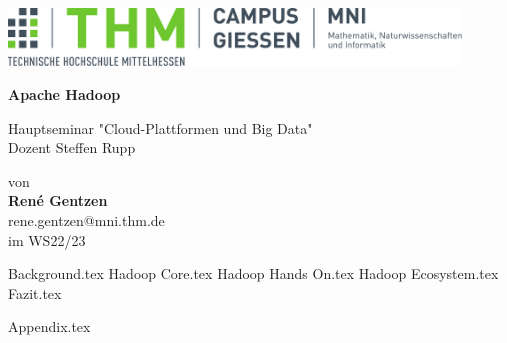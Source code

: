 \documentclass[%
	BCOR=8.25mm,         %
	DIV=12,              %
	parskip=half,		 %
	bibliography=totoc,	 %
	headsepline=on,      %
	]{scrbook}
\begin{document}
\frontmatter

\begin{titlepage}
	\begin{center}
	\includegraphics[width=0.9\textwidth]{mni-logo}
	
	\vspace{5cm}	

	\vspace{1cm}	

	\huge\textbf{\sffamily Apache Hadoop}

	\normalsize
	\vspace{1cm}	

	Hauptseminar "Cloud-Plattformen und Big Data" \\
	Dozent Steffen Rupp

	von \\[1cm]	

	\textbf{René Gentzen}\\ [.5cm] 
	rene.gentzen@mni.thm.de\\ [.5cm] 
	im WS22/23
	\end{center}
	\vfill
\end{titlepage}

\tableofcontents
\listoffigures

\mainmatter 
\pagestyle{headings}
{Background.tex}
{Hadoop Core.tex}
{Hadoop Hands On.tex}
{Hadoop Ecosystem.tex}
{Fazit.tex}



\backmatter 

\appendix
{Appendix.tex}
\printbibliography
\end{document}
